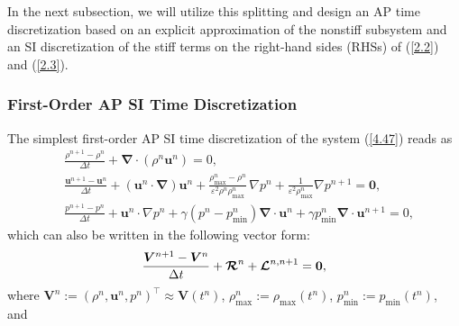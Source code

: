 \documentclass[A4paper,12pt,twoside]{article}
\numberwithin{equation}{section}
\numberwithin{figure}{section}
\numberwithin{table}{section}
\def\bnabla{\bm{\nabla}}
\newcommand{\dt}{\Delta t}
\newcommand{\ve}{\varepsilon}
\newcommand\eref[1]{(\ref{#1})}
\begin{document}
In the next subsection, we will utilize this splitting and design an AP time discretization based on an explicit approximation of the
nonstiff subsystem and an SI discretization of the stiff terms on the right-hand sides (RHSs) of \eref{2.2} and \eref{2.3}.

\subsubsection{First-Order AP SI Time Discretization}
The simplest first-order AP SI time discretization of the system \eref{4.47} reads as
\begin{equation}
\begin{aligned}
&\frac{\rho^{n+1}-\rho^n}{\dt}+\bnabla\!\cdot\!(\rho^n\bm u^n)=0,\\
&\frac{\bm u^{n+1}-\bm u^n}{\dt}+(\bm u^n\!\cdot\!\bnabla)\bm u^n+\frac{\rho_{\max}^n-\rho^n}{\ve^2\rho^n\rho_{\max}^n}\,\nabla p^n+
\frac{1}{\ve^2\rho_{\max}^n}\nabla p^{n+1}=\bm0,\\
&\frac{p^{n+1}-p^n}{\dt}+\bm u^n\!\cdot\!\nabla p^n+\gamma(p^n-p_{\min}^n)\bnabla\!\cdot\!\bm u^n+\gamma p_{\min}^n
\bnabla\!\cdot\!\bm u^{n+1}=0,
\end{aligned}
\label{4.8}
\end{equation}
which can also be written in the following vector form:
\begin{equation*}
\frac{\bm V^{n+1}-\bm V^n}{\dt}+\bm{{\cal R}}^n+\bm{{\cal L}}^{n,n+1}=\bm0,
\end{equation*}
where $\bm V^n:=(\rho^n,\bm u^n,p^n)^\top\approx\bm V(t^n)$, $\rho_{\max}^n:=\rho_{\max}(t^n)$, $p_{\min}^n:=p_{\min}(t^n)$, and 
\end{document}
